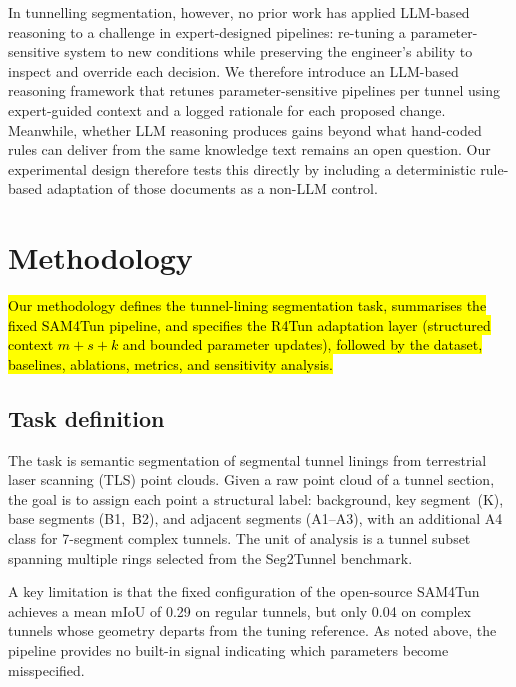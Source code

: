 \documentclass[a4paper,fleqn]{cas-dc}
\begin{document}
{In tunnelling segmentation, however, no prior work has applied LLM-based reasoning to a challenge in expert-designed pipelines: re-tuning a parameter-sensitive system to new conditions while preserving the engineer's ability to inspect and override each decision. We therefore introduce an LLM-based reasoning framework that retunes parameter-sensitive pipelines per tunnel using expert-guided context and a logged rationale for each proposed change. Meanwhile, whether LLM reasoning produces gains beyond what hand-coded rules can deliver from the same knowledge text remains an open question. Our experimental design therefore tests this directly by including a deterministic rule-based adaptation of those documents as a non-LLM control.




\section{Methodology}\label{sec:methods}

\hl{Our methodology defines the tunnel-lining segmentation task, summarises the fixed SAM4Tun pipeline, and specifies the R4Tun adaptation layer (structured context \mbox{$m+s+k$} and bounded parameter updates), followed by the dataset, baselines, ablations, metrics, and sensitivity analysis.}

\subsection{Task definition}\label{sec:problem-def}

The task is semantic segmentation of segmental tunnel linings from terrestrial laser scanning (TLS) point clouds. Given a raw point cloud of a tunnel section, the goal is to assign each point a structural label: background, key segment~(K), base segments (B1,~B2), and adjacent segments (A1--A3), with an additional A4 class for 7-segment complex tunnels. The unit of analysis is a tunnel subset spanning multiple rings selected from the Seg2Tunnel benchmark. 

A key limitation is that the fixed configuration of the open-source SAM4Tun achieves a mean mIoU of 0.29 on regular tunnels, but only 0.04 on complex tunnels whose geometry departs from the tuning reference. As noted above, the pipeline provides no built-in signal indicating which parameters become misspecified.

}
\end{document}
